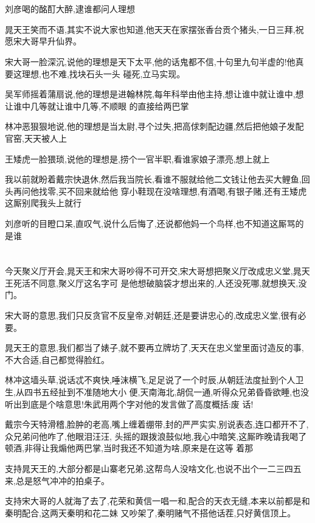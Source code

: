 ﻿\documentclass[12pt]{article}
\begin{document}
\section{}

刘彦喝的酩酊大醉,逮谁都问人理想

晁天王笑而不语,其实不说大家也知道,他天天在家摆张香台贡个猪头,一日三拜,祝愿宋大哥早升仙界。

宋大哥一脸深沉,说他的理想是天下太平,他的话鬼都不信,十句里九句半虚的!他真要这理想,也不难,找块石头一头
碰死,立马实现。

吴军师摇着蒲扇说,他的理想是进翰林院,每年科举由他主持,想让谁中就让谁中,想让谁中几等就让谁中几等,不顺眼
的直接给两巴掌

林冲恶狠狠地说,他的理想是当太尉,寻个过失,把高俅刺配边疆,然后把他娘子发配官窑,天天被人上

王矮虎一脸猥琐,说他的理想是,捞个一官半职,看谁家娘子漂亮,想上就上

我以前就盼着戴宗快退休,然后我当院长,看谁不服就给他二文钱让他去买大鲤鱼,回头再问他找零,买不回来就给他
穿小鞋\dldots 现在没啥理想,有酒喝,有银子赌,还有王矮虎这厮别爬我头上就行\dldots

刘彦听的目瞪口呆,直叹气,说什么后悔了,还说都他妈一个鸟样,也不知道这厮骂的是谁
\section{}

今天聚义厅开会,晁天王和宋大哥吵得不可开交,宋大哥想把聚义厅改成忠义堂,晁天王死活不同意,聚义厅这名字可
是他想破脑袋才想出来的,人还没死哪,就想换天,没门。

宋大哥的意思,我们只反贪官不反皇帝,对朝廷,还是要讲忠心的,改成忠义堂,很有必要。

晁天王的意思,我们都当了婊子,就不要再立牌坊了,天天在忠义堂里面讨造反的事,不大合适,自己都觉得脸红。

林冲这墙头草,说话忒不爽快,唾沫横飞,足足说了一个时辰,从朝廷法度扯到个人卫生,从四书五经扯到不准随地大小
便,天南海北,胡侃一通,听得众兄弟昏昏欲睡,也没听出到底是个啥意思!朱武用两个字对他的发言做了高度概括:废
话!

戴宗今天特滑稽,脸肿的老高,嘴上缠着绷带,封的严严实实,别说表态,连口都开不了,众兄弟问他咋了,他眼泪汪汪,
头摇的跟拨浪鼓似地,我心中暗笑,这厮昨晚请我喝了顿酒,非得让我煽他两巴掌,当时我还不知道为啥,原来是在这等
着那\dldots

支持晁天王的,大部分都是山寨老兄弟,这帮鸟人没啥文化,也说不出个一二三四五来,总是怒气冲冲的拍桌子。

支持宋大哥的人就海了去了,花荣和黄信一唱一和,配合的天衣无缝,本来以前都是和秦明配合,这两天秦明和花二妹
又吵架了,秦明赌气不搭他话茬,只好黄信顶上。
\end{document}

